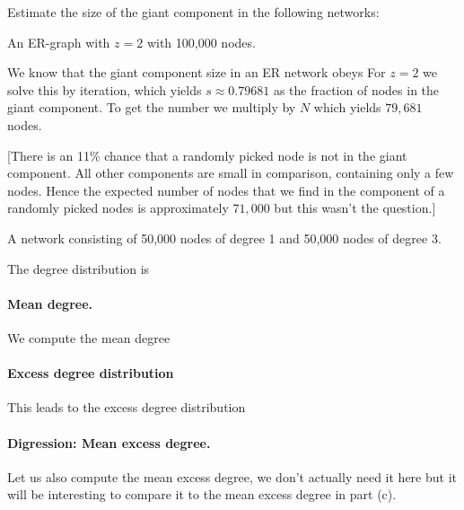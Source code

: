 Estimate the size of the giant component in the following networks:

\subquestion An ER-graph with $z=2$ with 100,000 nodes.

\solution
We know that the giant component size in an ER network obeys
For $z=2$ we solve this by iteration, which yields $s\approx 0.79681$ as the fraction of nodes in the giant component. To get the number we multiply by $N$ which yields $79,681$ nodes. 

[There is an 11\% chance that a randomly picked node is not in the giant component. All other components are small in comparison, containing only a few nodes. Hence the expected number of nodes that we find in the component of a randomly picked nodes is  
approximately $71,000$ but this wasn't the question.] 

\subquestion A network consisting of 50,000 nodes of degree 1 and 50,000 nodes of degree 3.

\solution
The degree distribution is 

\paragraph{Mean degree.}We compute the mean degree

\paragraph{Excess degree distribution}This leads to the excess degree distribution
\paragraph{Digression: Mean excess degree.}Let us also compute the mean excess degree, we don't actually need it here but it will be interesting to compare it to the mean excess degree in part (c).
